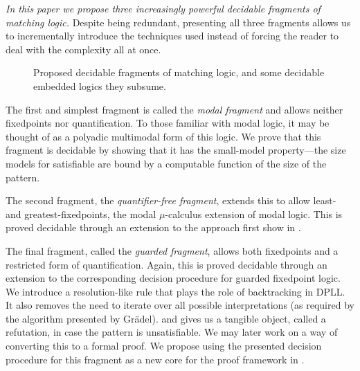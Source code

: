 \emph{In this paper we propose three increasingly powerful decidable fragments of matching logic.}
Despite being redundant, presenting all three fragments allows us to incrementally introduce the techniques used
instead of forcing the reader to deal with the complexity all at once.

\begin{figure}
\def\columnwidth{\columnwidth}
\newcommand{\g}[1]{$\Gamma_\text{#1}$}

\caption{Proposed decidable fragments of matching logic, and some decidable embedded logics they subsume.}
\end{figure}

The first and simplest fragment is called the \emph{modal fragment} and allows neither fixedpoints nor quantification.
To those familiar with modal logic, it may be thought of as a polyadic multimodal form of this logic.
We prove that this fragment is decidable by showing that it has the small-model
property---the size models for satisfiable are bound by a computable function of the size of the pattern.

The second fragment, the \emph{quantifier-free fragment}, extends this to allow
least- and greatest-fixedpoints, the modal \(\mu\)-calculus extension of modal logic.
This is proved decidable through an extension to the approach
first show in \cite{games-for-mu-calculus}.

The final fragment, called the \emph{guarded fragment},
allows both fixedpoints and a restricted form of quantification.
Again, this is proved decidable through an extension to the corresponding
decision procedure for guarded fixedpoint logic.
We introduce a resolution-like rule that plays the role of backtracking in DPLL.
It also removes the need to iterate over all possible interpretations
(as required by the algorithm presented by Grädel).
and gives us a tangible object, called a refutation, in case the pattern is unsatisfiable.
We may later work on a way of converting this to a formal proof.
We propose using the presented decision procedure for this fragment as a new
core for the proof framework in \cite{towards-a-unified-framework}.
